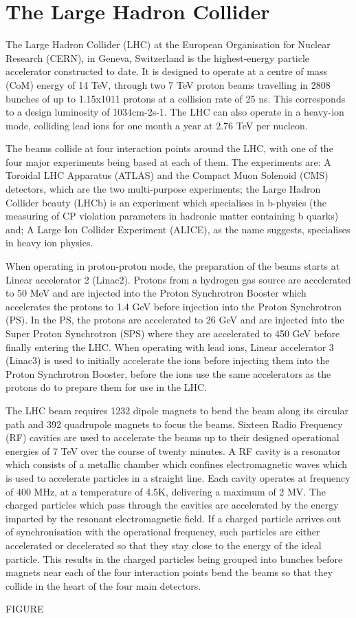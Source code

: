 \section{The Large Hadron Collider}\label{sec:lhc}

The Large Hadron Collider (LHC) at the European Organisation for Nuclear Research (CERN), in Geneva, Switzerland is the highest-energy particle accelerator constructed to date. 
It is designed to operate at a centre of mass (CoM) energy of 14 TeV, through two 7 TeV proton beams travelling in 2808 bunches of up to 1.15x1011 protons at a collision rate of 25 ns. 
This corresponds to a design luminosity of 1034cm-2s-1. 
The LHC can also operate in a heavy-ion mode, colliding lead ions for one month a year at 2.76 TeV per nucleon. 

The beams collide at four interaction points around the LHC, with one of the four major experiments being based at each of them. 
The experiments are: A Toroidal LHC Apparatus (ATLAS) and the Compact Muon Solenoid (CMS) detectors, which are the two multi-purpose experiments; the Large Hadron Collider beauty (LHCb) is an experiment which specialises in b-physics (the measuring of CP violation parameters in hadronic matter containing b quarks) and; A Large Ion Collider Experiment (ALICE), as the name suggests, specialises in heavy ion physics. 

When operating in proton-proton mode, the preparation of the beams starts at Linear accelerator 2 (Linac2). 
Protons from a hydrogen gas source are accelerated to 50 MeV and are injected into the Proton Synchrotron Booster which accelerates the protons to 1.4 GeV before injection into the Proton Synchrotron (PS). 
In the PS, the protons are accelerated to 26 GeV and are injected into the Super Proton Synchrotron (SPS) where they are accelerated to 450 GeV before finally entering the LHC. 
When operating with lead ions, Linear accelerator 3 (Linac3) is used to initially accelerate the ions before injecting them into the Proton Synchrotron Booster, before the ions use the same accelerators as the protons do to prepare them for use in the LHC. 

The LHC beam requires 1232 dipole magnets to bend the beam along its circular path and 392 quadrupole magnets to focus the beams. 
Sixteen Radio Frequency (RF) cavities are used to accelerate the beams up to their designed operational energies of 7 TeV over the course of twenty minutes. 
A RF cavity is a resonator which consists of a metallic chamber which confines electromagnetic waves which is used to accelerate particles in a straight line. 
Each cavity operates at frequency of 400 MHz, at a temperature of 4.5K, delivering a maximum of 2 MV. 
The charged particles which pass through the cavities are accelerated by the energy imparted by the resonant electromagnetic field. 
If a charged particle arrives out of synchronisation with the operational frequency, such particles are either accelerated or decelerated so that they stay close to the energy of the ideal particle. 
This results in the charged particles being grouped into bunches before magnets near each of the four interaction points bend the beams so that they collide in the heart of the four main detectors. 

FIGURE
